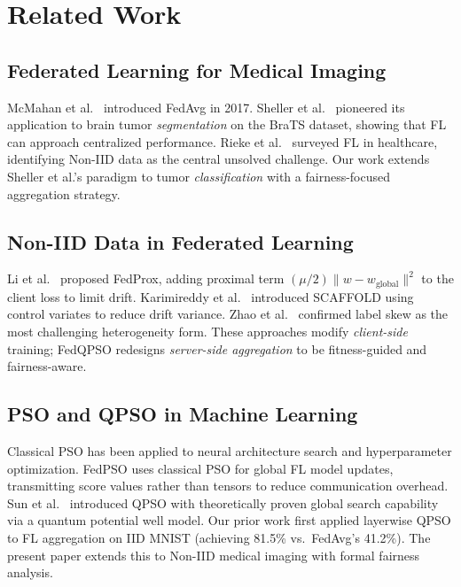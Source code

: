 \documentclass[conference]{IEEEtran}
\begin{document}
\section{Related Work}
\label{sec:related}

\subsection{Federated Learning for Medical Imaging}
McMahan et al.\ \cite{mcmahan2017} introduced FedAvg in 2017. Sheller et al.\
\cite{sheller2018} pioneered its application to brain tumor \emph{segmentation}
on the BraTS dataset, showing that FL can approach centralized performance.
Rieke et al.\ \cite{rieke2020} surveyed FL in healthcare, identifying Non-IID
data as the central unsolved challenge. Our work extends Sheller et al.'s
paradigm to tumor \emph{classification} with a fairness-focused aggregation
strategy.

\subsection{Non-IID Data in Federated Learning}
Li et al.\ \cite{li2020fedprox} proposed FedProx, adding proximal term
$(\mu/2)\|w - w_{\text{global}}\|^2$ to the client loss to limit drift.
Karimireddy et al.\ \cite{karimireddy2020scaffold} introduced SCAFFOLD using
control variates to reduce drift variance. Zhao et al.\ \cite{zhao2018}
confirmed label skew as the most challenging heterogeneity form. These
approaches modify \emph{client-side} training; FedQPSO redesigns
\emph{server-side aggregation} to be fitness-guided and fairness-aware.

\subsection{PSO and QPSO in Machine Learning}
Classical PSO \cite{kennedy1995} has been applied to neural architecture
search and hyperparameter optimization. FedPSO \cite{fedpso2021} uses
classical PSO for global FL model updates, transmitting score values rather
than tensors to reduce communication overhead. Sun et al.\ \cite{sun2004qpso}
introduced QPSO with theoretically proven global search capability via a
quantum potential well model. Our prior work \cite{edla2025mnist} first applied
layerwise QPSO to FL aggregation on IID MNIST (achieving 81.5\% vs.\ FedAvg's
41.2\%). The present paper extends this to Non-IID medical imaging with formal
fairness analysis.
\end{document}
